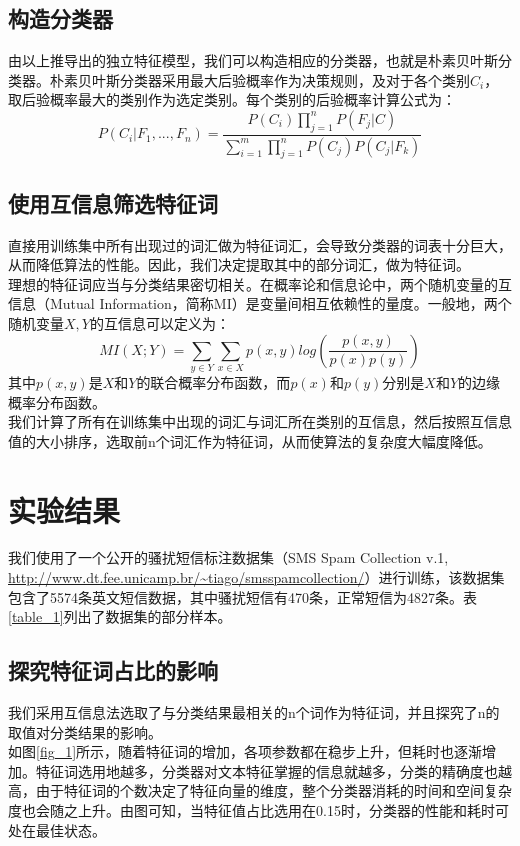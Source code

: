\documentclass[a4paper, twocolumn, 12pt]{article}
\begin{document}
\subsection{构造分类器}
由以上推导出的独立特征模型，我们可以构造相应的分类器，也就是朴素贝叶斯分类器。朴素贝叶斯分类器采用最大后验概率作为决策规则，及对于各个类别$C_i$，取后验概率最大的类别作为选定类别。每个类别的后验概率计算公式为：
\[P(C_i|F_1, ..., F_n)=\frac{P(C_i)\prod_{j=1}^nP(F_j|C)}{\sum_{i=1}^m \prod_{j=1}^nP(C_j)P(C_j|F_k)}\]

\subsection{使用互信息筛选特征词}
直接用训练集中所有出现过的词汇做为特征词汇，会导致分类器的词表十分巨大，从而降低算法的性能。因此，我们决定提取其中的部分词汇，做为特征词。\\

理想的特征词应当与分类结果密切相关。在概率论和信息论中，两个随机变量的互信息（Mutual Information，简称MI）是变量间相互依赖性的量度。一般地，两个随机变量$X, Y$的互信息可以定义为：
\[MI(X; Y)=\sum_{y\in Y}\sum_{x\in X}p(x, y)log(\frac{p(x, y)}{p(x)p(y)})\]
其中$p(x,y)$是$X$和$Y$的联合概率分布函数，而$p(x)$和$p(y)$分别是$X$和$Y$的边缘概率分布函数。\\

我们计算了所有在训练集中出现的词汇与词汇所在类别的互信息，然后按照互信息值的大小排序，选取前n个词汇作为特征词，从而使算法的复杂度大幅度降低。

\section{实验结果}

我们使用了一个公开的骚扰短信标注数据集（SMS Spam Collection v.1, \url{http://www.dt.fee.unicamp.br/~tiago/smsspamcollection/}）进行训练，该数据集包含了5574条英文短信数据，其中骚扰短信有470条，正常短信为4827条。表\ref{table_1}列出了数据集的部分样本。\\

\subsection{探究特征词占比的影响}
我们采用互信息法选取了与分类结果最相关的n个词作为特征词，并且探究了n的取值对分类结果的影响。\\

如图\ref{fig_1}所示，随着特征词的增加，各项参数都在稳步上升，但耗时也逐渐增加。特征词选用地越多，分类器对文本特征掌握的信息就越多，分类的精确度也越高，由于特征词的个数决定了特征向量的维度，整个分类器消耗的时间和空间复杂度也会随之上升。由图可知，当特征值占比选用在0.15时，分类器的性能和耗时可处在最佳状态。
\end{document}
